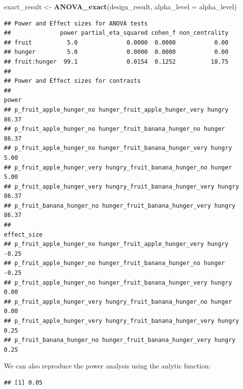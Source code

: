\documentclass[]{book}
\newenvironment{Shaded}{\begin{snugshade}}{\end{snugshade}}
\newcommand{\DataTypeTok}[1]{\textcolor[rgb]{0.13,0.29,0.53}{#1}}
\newcommand{\KeywordTok}[1]{\textcolor[rgb]{0.13,0.29,0.53}{\textbf{#1}}}
\newcommand{\NormalTok}[1]{#1}
\newcommand{\OperatorTok}[1]{\textcolor[rgb]{0.81,0.36,0.00}{\textbf{#1}}}
\newcommand{\StringTok}[1]{\textcolor[rgb]{0.31,0.60,0.02}{#1}}
\begin{document}
\begin{Shaded}
\begin{Highlighting}[]
\NormalTok{exact_result <-}\StringTok{ }\KeywordTok{ANOVA_exact}\NormalTok{(design_result, }\DataTypeTok{alpha_level =}\NormalTok{ alpha_level)}
\end{Highlighting}
\end{Shaded}

\begin{verbatim}
## Power and Effect sizes for ANOVA tests
##              power partial_eta_squared cohen_f non_centrality
## fruit          5.0              0.0000  0.0000           0.00
## hunger         5.0              0.0000  0.0000           0.00
## fruit:hunger  99.1              0.0154  0.1252          18.75
## 
## Power and Effect sizes for contrasts
##                                                                  power
## p_fruit_apple_hunger_no hunger_fruit_apple_hunger_very hungry    86.37
## p_fruit_apple_hunger_no hunger_fruit_banana_hunger_no hunger     86.37
## p_fruit_apple_hunger_no hunger_fruit_banana_hunger_very hungry    5.00
## p_fruit_apple_hunger_very hungry_fruit_banana_hunger_no hunger    5.00
## p_fruit_apple_hunger_very hungry_fruit_banana_hunger_very hungry 86.37
## p_fruit_banana_hunger_no hunger_fruit_banana_hunger_very hungry  86.37
##                                                                  effect_size
## p_fruit_apple_hunger_no hunger_fruit_apple_hunger_very hungry          -0.25
## p_fruit_apple_hunger_no hunger_fruit_banana_hunger_no hunger           -0.25
## p_fruit_apple_hunger_no hunger_fruit_banana_hunger_very hungry          0.00
## p_fruit_apple_hunger_very hungry_fruit_banana_hunger_no hunger          0.00
## p_fruit_apple_hunger_very hungry_fruit_banana_hunger_very hungry        0.25
## p_fruit_banana_hunger_no hunger_fruit_banana_hunger_very hungry         0.25
\end{verbatim}

We can also reproduce the power analysis using the anlytic function:

\begin{Shaded}
\end{Shaded}

\begin{verbatim}
## [1] 0.05
\end{verbatim}
\end{document}
